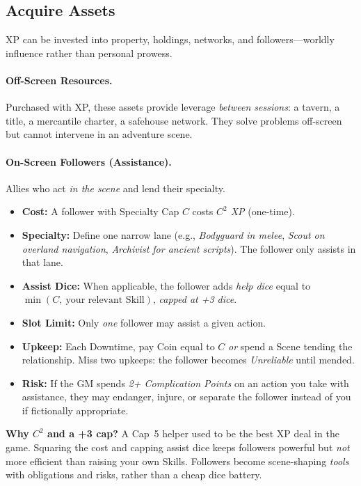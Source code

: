 \documentclass[12pt]{book}
\begin{document}
\subsection{Acquire Assets}
XP can be invested into property, holdings, networks, and followers—worldly influence rather than personal prowess.

\paragraph{Off-Screen Resources.}
Purchased with XP, these assets provide leverage \emph{between sessions}: a tavern, a title, a mercantile charter, a safehouse network. They solve problems off-screen but cannot intervene in an adventure scene.

\paragraph{On-Screen Followers (Assistance).}
Allies who act \emph{in the scene} and lend their specialty.
\begin{itemize}
  \item \textbf{Cost:} A follower with Specialty Cap $C$ costs \emph{$C^2$ XP} (one-time).
  \item \textbf{Specialty:} Define one narrow lane (e.g., \emph{Bodyguard in melee}, \emph{Scout on overland navigation}, \emph{Archivist for ancient scripts}). The follower only assists in that lane.
  \item \textbf{Assist Dice:} When applicable, the follower adds \emph{help dice} equal to $\min(C,\ \text{your relevant Skill})$, \emph{capped at +3 dice}.
  \item \textbf{Slot Limit:} Only \emph{one} follower may assist a given action.
  \item \textbf{Upkeep:} Each Downtime, pay Coin equal to $C$ \emph{or} spend a Scene tending the relationship. Miss two upkeeps: the follower becomes \emph{Unreliable} until mended.
  \item \textbf{Risk:} If the GM spends \emph{2+ Complication Points} on an action you take with assistance, they may endanger, injure, or separate the follower instead of you if fictionally appropriate.
\end{itemize}

\begin{designnote}
\textbf{Why $C^2$ and a +3 cap?} A Cap~5 helper used to be the best XP deal in the game. Squaring the cost and capping assist dice keeps followers powerful but \emph{not} more efficient than raising your own Skills. Followers become scene-shaping \emph{tools} with obligations and risks, rather than a cheap dice battery.
\end{designnote}
\end{document}
